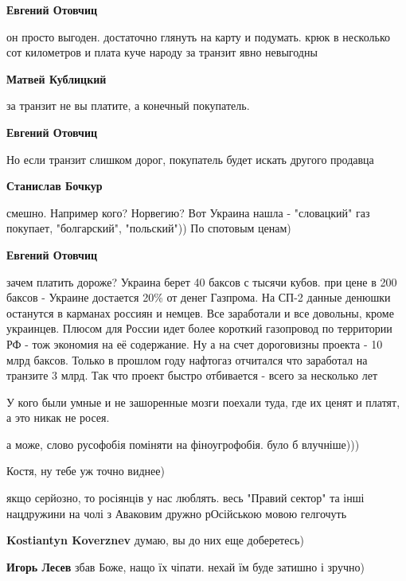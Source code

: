 \begin{itemize}
\begin{itemize}
\textbf{Евгений Отовчиц} 

он просто выгоден. достаточно глянуть на карту и подумать. крюк в несколько сот
километров и плата куче народу за транзит явно невыгодны

\textbf{Матвей Кублицкий} 

за транзит не вы платите, а конечный покупатель.

\textbf{Евгений Отовчиц} 

Но если транзит слишком дорог, покупатель будет искать другого продавца

\textbf{Станислав Бочкур} 

смешно. Например кого? Норвегию? Вот Украина нашла - "словацкий" газ покупает,
"болгарский", "польский")) По спотовым ценам)

\textbf{Евгений Отовчиц} 

зачем платить дороже? Украина берет 40 баксов с тысячи кубов. при цене в 200
баксов - Украине достается 20\% от денег Газпрома. На СП-2 данные денюшки
останутся в карманах россиян и немцев. Все заработали и все довольны, кроме
украинцев. Плюсом для России идет более короткий газопровод по территории РФ -
тож экономия на её содержание. Ну а на счет дороговизны проекта - 10 млрд
баксов. Только в прошлом году нафтогаз отчитался что заработал на транзите 3
млрд. Так что проект быстро отбивается - всего за несколько лет


У кого были умные и не зашоренные мозги поехали туда, где их ценят и платят, а это никак не росея.

\end{itemize} %


а може, слово русофобія поміняти на фіноугрофобія. було б влучніше)))

\begin{itemize} %
Костя, ну тебе уж точно виднее)


якщо серйозно, то росіянців у нас люблять. весь "Правий сектор" та інші
нацдружини на чолі з Аваковим дружно рОсійською мовою гелгочуть

\textbf{Kostiantyn Koverznev} думаю, вы до них еще доберетесь)

\textbf{Игорь Лесев} збав Боже, нащо їх чіпати. нехай їм буде затишно і зручно)
\end{itemize} %


\end{itemize}
